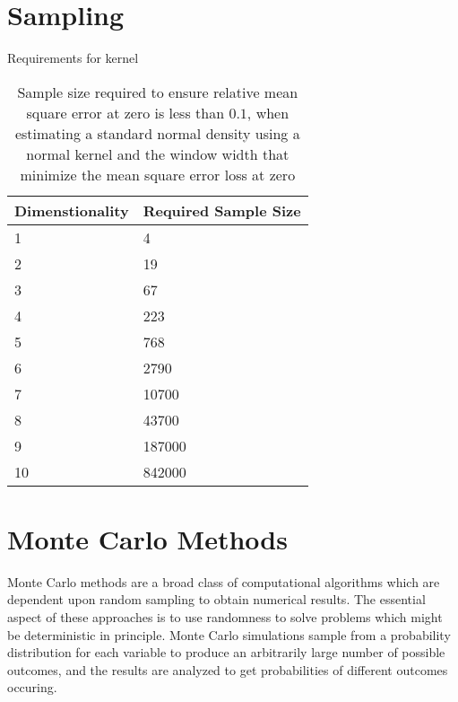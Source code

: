 \section{Sampling}

Requirements for kernel
\begin{table}[htbp]
   \caption{Sample size required to ensure relative mean square error at zero is
       less than $0.1$, when estimating a standard normal density using a normal
       kernel and the window width that minimize the mean square error loss at
       zero\cite{silverman1986_density_estimation}}
   \label{tab:kde_sample_req}
   \begin{tabularx}{6.5in}{XX}
     \hline
     Dimenstionality & Required Sample Size \\
     \hline
     1 & 4 \\
     2 & 19 \\
     3 & 67 \\
     4 & 223 \\
     5 & 768 \\
     6 & 2790 \\
     7 & 10700 \\
     8 & 43700 \\
     9 & 187000 \\
     10 & 842000 \\
     \hline
   \end{tabularx}
\end{table}

\section{Monte Carlo Methods}

Monte Carlo methods are a broad class of computational algorithms which are dependent upon random sampling to obtain numerical results.
The essential aspect of these approaches is to use randomness to solve problems which might be deterministic in principle.
Monte Carlo simulations sample from a probability distribution for each variable to produce an arbitrarily large number of possible outcomes, and  the results are analyzed to get probabilities of different outcomes occuring.
